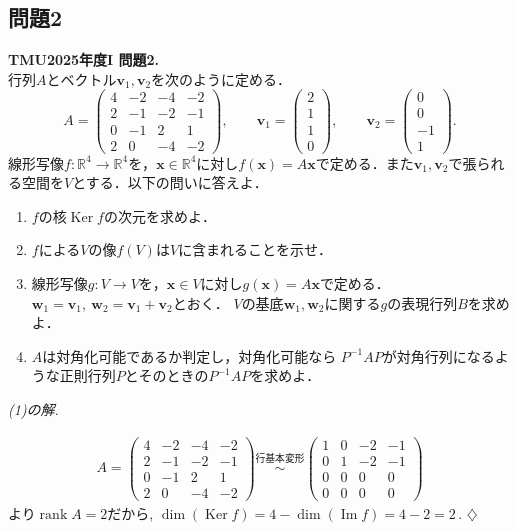 \documentclass[titlepage]{jsarticle}
\numberwithin{equation}{section}
\newcommand{\R}{\mathbb{R}}%
\newcommand{\Ker}{\operatorname{Ker}}
\renewcommand{\Im}{\operatorname{Im}}
\newcommand{\rank}{\operatorname{rank}}
\newenvironment{kaitou}[1][解]{%
\begin{proofbox}%
\textit{#1. }\ignorespaces
}{%
\hfill$\diamondsuit$%
\end{proofbox}%
}
\begin{document}
\subsection{問題2}
\begin{problem}
\textbf{TMU2025年度I 問題2.}\\
行列$A$とベクトル$\bm{v}_1,\bm{v}_2$を次のように定める．
\[
A=
\begin{pmatrix}
4 & -2 & -4 & -2\\
2 & -1 & -2 & -1\\
0 & -1 & 2 & 1\\
2 & 0 & -4 & -2
\end{pmatrix},
\qquad
\bm{v}_1=
\begin{pmatrix}
2\\
1\\
1\\
0
\end{pmatrix},
\qquad
\bm{v}_2=
\begin{pmatrix}
0\\
0\\
-1\\
1
\end{pmatrix}.
\]
線形写像$f:\R^4\to\R^4$を，$\bm{x}\in\R^4$に対し$f(\bm{x})=A\bm{x}$で定める．また$\bm{v}_1,\bm{v}_2$で張られる空間を$V$とする．以下の問いに答えよ．

\begin{enumerate}[label=(\arabic*)]
    \item $f$の核$\Ker f$の次元を求めよ．
    
    \item $f$による$V$の像$f(V)$は$V$に含まれることを示せ．
    
    \item 線形写像$g:V\to V$を，$\bm{x}\in V$に対し$g(\bm{x})=A\bm{x}$で定める．
    $\bm{w}_1=\bm{v}_1,\ \bm{w}_2=\bm{v}_1+\bm{v}_2$とおく．
    $V$の基底$\bm{w}_1,\bm{w}_2$に関する$g$の表現行列$B$を求めよ．
    
    \item $A$は対角化可能であるか判定し，対角化可能なら
    $P^{-1}AP$が対角行列になるような正則行列$P$とそのときの$P^{-1}AP$を求めよ．
\end{enumerate}
\end{problem}
\begin{kaitou}[(1)の解]
\begin{align}
A=
\begin{pmatrix}
4 & -2 & -4 & -2\\
2 & -1 & -2 & -1\\
0 & -1 & 2 & 1\\
2 & 0 & -4 & -2
\end{pmatrix}
\stackrel{\text{行基本変形}}{\sim}
\begin{pmatrix}
1 & 0 & -2 & -1\\
0 & 1 & -2 & -1\\
0 & 0 & 0 & 0 \\
0 & 0 & 0 & 0
\end{pmatrix} \label{tmu2025-2d}
\end{align}
より$\rank A = 2$だから, $\dim(\Ker f) = 4 - \dim(\Im f) = 4 - 2 = \boxed{2}$\,.
\end{kaitou}
\end{document}
